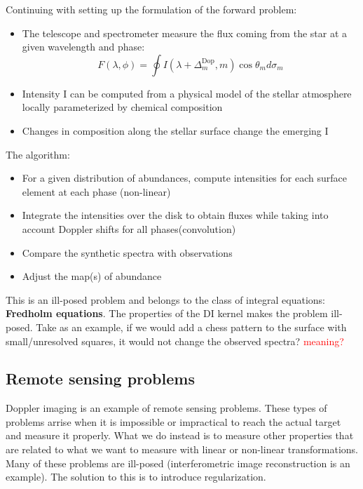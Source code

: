 	Continuing with setting up the formulation of the forward problem:
		
		\begin{itemize}
			\item The telescope and spectrometer measure the flux coming from the star at a given wavelength and phase: 
			\begin{equation}
			 	F(\lambda, \phi) = \oint I(\lambda + \Delta^{\text{Dop}}_m,m)\cos \theta_m d \sigma_m
			 \end{equation} 
			 \item Intensity I can be computed from a physical model of the stellar atmosphere locally parameterized by chemical composition
			 \item Changes in composition along the stellar surface change the emerging I
		\end{itemize}

	The algorithm: 

		\begin{itemize}
			\item For a given distribution of abundances, compute intensities for each surface element at each phase (non-linear)
			\item Integrate the intensities over the disk to obtain fluxes while taking into account Doppler shifts for all phases(convolution)
			\item Compare the synthetic spectra with observations
			\item Adjust the map(s) of abundance 
		\end{itemize}

	This is an ill-posed problem and belongs to the class of integral equations: \textbf{Fredholm equations}. The properties of the DI kernel makes the problem ill-posed. Take as an example, if we would add a chess pattern to the surface with small/unresolved squares, it would not change the observed spectra? \textcolor{red}{meaning?}

	\subsection{Remote sensing problems}
	Doppler imaging is an example of remote sensing problems. These types of problems arrise when it is impossible or impractical to reach the actual target and measure it properly. What we do instead is to measure other properties that are related to what we want to measure with linear or non-linear transformations. Many of these problems are ill-posed (interferometric image reconstruction is an example). The solution to this is to introduce regularization.

